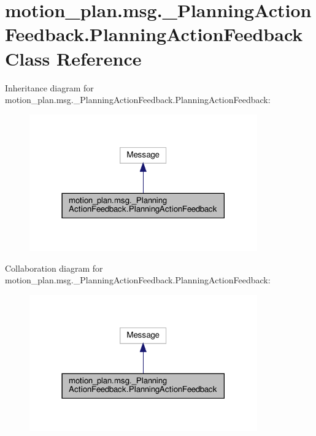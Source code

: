 \hypertarget{classmotion__plan_1_1msg_1_1__PlanningActionFeedback_1_1PlanningActionFeedback}{}\section{motion\+\_\+plan.\+msg.\+\_\+\+Planning\+Action\+Feedback.\+Planning\+Action\+Feedback Class Reference}
\label{classmotion__plan_1_1msg_1_1__PlanningActionFeedback_1_1PlanningActionFeedback}


Inheritance diagram for motion\+\_\+plan.\+msg.\+\_\+\+Planning\+Action\+Feedback.\+Planning\+Action\+Feedback\+:
\nopagebreak
\begin{figure}[H]
\begin{center}
\leavevmode
\includegraphics[width=278pt]{classmotion__plan_1_1msg_1_1__PlanningActionFeedback_1_1PlanningActionFeedback__inherit__graph}
\end{center}
\end{figure}


Collaboration diagram for motion\+\_\+plan.\+msg.\+\_\+\+Planning\+Action\+Feedback.\+Planning\+Action\+Feedback\+:
\nopagebreak
\begin{figure}[H]
\begin{center}
\leavevmode
\includegraphics[width=278pt]{classmotion__plan_1_1msg_1_1__PlanningActionFeedback_1_1PlanningActionFeedback__coll__graph}
\end{center}
\end{figure}
